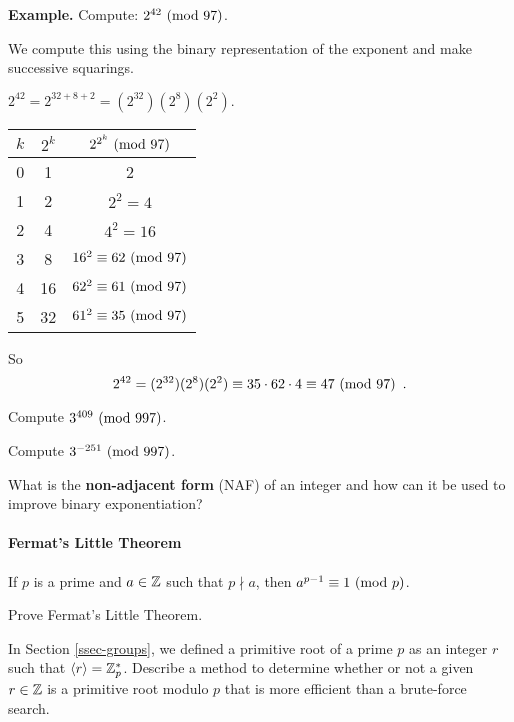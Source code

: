 {\bf Example.} Compute: $2^{42} \mbox{\ $\left(\mathrm{mod}\ {97}\right)$}$.

We compute this using the binary representation of the exponent and make successive squarings.

$2^{42} = 2^{32 + 8 + 2} = (2^{32})(2^8)(2^2).$
\begin{center}
\begin{tabular}{|c|c|c|}
\hline
$k$ & $2^k$ & $2^{2^k} \mbox{\ $\left(\mathrm{mod}\ {97}\right)$}$\\
\hline
0 & 1 & 2\\
1 & 2 & $2^2 = 4$\\
2 & 4 & $4^2 = 16$\\
3 & 8 & $16^2 \equiv 62 \mbox{\ $\left(\mathrm{mod}\ {97}\right)$}$\\
4 & 16 & $62^2 \equiv 61 \mbox{\ $\left(\mathrm{mod}\ {97}\right)$}$\\
5 & 32 & $61^2 \equiv 35 \mbox{\ $\left(\mathrm{mod}\ {97}\right)$}$\\
\hline
\end{tabular}
\end{center}
So
$$2^{42} = (2^{32})(2^8)(2^2) \equiv 35\cdot 62 \cdot 4 \equiv 47 \mbox{\ $\left(\mathrm{mod}\ {97}\right)$} \enspace .$$

\begin{problem} [10 points]
Compute $3^{409} \mbox{\ $\left(\mathrm{mod}\ {997}\right)$}$.
\end{problem}

\begin{problem}[10 points]
Compute $3^{-251}\mbox{\ $\left(\mathrm{mod}\ {997}\right)$}$.
\end{problem}

\begin{problem}[15 points]
What is the {\bf non-adjacent form} (NAF) of an integer and how can it be used to improve binary exponentiation?
\end{problem}

		\paragraph*{Fermat's Little Theorem}

		\begin{theorem}
			If $p$ is a prime and $a\in \mathbb{Z}$ such that $p\nmid a$, then $a^{p-1} \equiv 1 \mbox{\ $\left(\mathrm{mod}\ {p}\right)$}$.
		\end{theorem}

		\begin{problem}  [10 points]
			Prove Fermat's Little Theorem.
		\end{problem}

		\begin{problem} [15 points]
			In Section \ref{ssec-groups}, we defined a primitive root of a prime $p$ as an integer $r$ such that $\left\langle r\right\rangle=\mathbb{Z}_p^*$. Describe a method to determine whether or not a given $r\in\mathbb{Z}$ is a primitive root modulo $p$ that is more efficient than a brute-force search.
		\end{problem}

